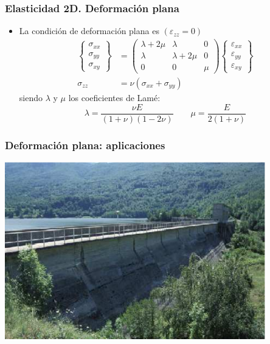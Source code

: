 \documentclass[handout]{beamer}
\begin{document}
\begin{frame}
\frametitle{Elasticidad 2D. Deformación plana}
\begin{itemize}
\item La condición de deformación plana es $(\varepsilon_{zz}=0)$
\begin{align}
\left\{
\begin{array}{c}
\sigma_{xx} \\
\sigma_{yy} \\
\sigma_{xy}
\end{array}
\right\}&=
\left(
\begin{array}{ccc}
\lambda+2\mu & \lambda     & 0 \\
\lambda     & \lambda+2\mu & 0 \\
0           & 0       & \mu
\end{array}
\right)
\left\{
\begin{array}{c}
\varepsilon_{xx} \\
\varepsilon_{yy} \\
\varepsilon_{xy}
\end{array}
\right\} \\
\sigma_{zz}&=\nu (\sigma_{xx}+\sigma_{yy})
\end{align}
siendo $\lambda$ y $\mu$ los coeficientes de Lamé:
\begin{equation}
\lambda=\frac{\nu E}{(1+\nu)(1-2\nu)}\qquad \mu=\frac{E}{2(1+\nu)}
\end{equation}
\end{itemize}
\end{frame}
\begin{frame}
\frametitle{Deformación plana: aplicaciones}
\begin{center}
\includegraphics[width=0.85\textwidth]{damgrav}
\end{center}
\end{frame}
\end{document}
